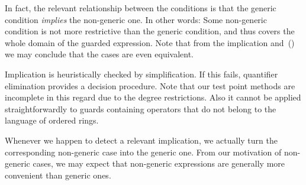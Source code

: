 In fact, the relevant relationship between the conditions is that the
generic condition {\em implies} the non-generic one. In other words:
Some non-generic condition is not more restrictive than the generic
condition, and thus covers the whole domain of the guarded expression.
Note that from the implication and~() we may
conclude that the cases are even equivalent.

Implication is heuristically checked by simplification. If this fails,
quantifier elimination provides a decision procedure. Note that our
test point methods are incomplete in this regard due to the degree
restrictions. Also it cannot be applied straightforwardly to guards
containing operators that do not belong to the language of ordered
rings.

Whenever we happen to detect a relevant implication, we actually turn
the corresponding non-generic case into the generic one. From our
motivation of non-generic cases, we may expect that non-generic
expressions are generally more convenient than generic ones.
%
